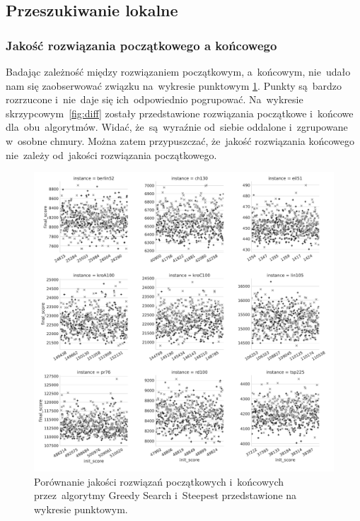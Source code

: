\subsection{Przeszukiwanie lokalne}

\subsubsection{Jakość rozwiązania początkowego a końcowego}

Badając zależność między rozwiązaniem początkowym, a~końcowym, nie~udało nam się zaobserwować związku na~wykresie punktowym \ref{fig:diff_point}. Punkty są~bardzo rozrzucone i~nie~daje się ich~odpowiednio pogrupować. Na~wykresie skrzypcowym~\ref{fig:diff} zostały przedstawione rozwiązania początkowe i~końcowe dla~obu~algorytmów. Widać, że~są~wyraźnie od~siebie oddalone i~zgrupowane w~osobne chmury. Można zatem przypuszczać, że~jakość rozwiązania końcowego nie~zależy od~jakości rozwiązania początkowego.

\begin{figure}[H]
\begin{center}
\includegraphics[width=1.0\textwidth]{graphs/init_vs_final_score_point.pdf}
\end{center}
\caption{Porównanie jakości rozwiązań początkowych i~końcowych przez~algorytmy Greedy Search i~Steepest przedstawione na wykresie punktowym.}
\label{fig:diff_point}
\end{figure}

